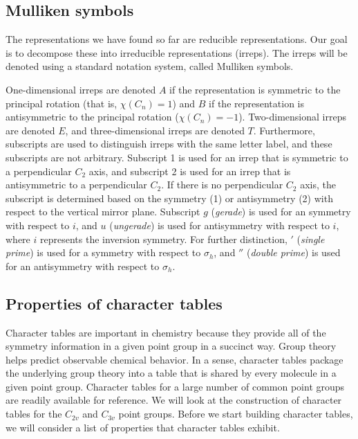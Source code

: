 \documentclass{article}
\begin{document}
    \subsection{Mulliken symbols}
    \label{sec:mulliken}

    The representations we have found so far are reducible representations. Our goal is to decompose these into irreducible representations (irreps). The irreps will be denoted using a standard notation system, called Mulliken symbols. \cite{mulliken1955}

    One-dimensional irreps are denoted $A$ if the representation is symmetric to the principal rotation (that is, $\chi(C_n)=1$) and $B$ if the representation is antisymmetric to the principal rotation ($\chi(C_n)=-1$). Two-dimensional irreps are denoted $E$, and three-dimensional irreps are denoted $T$. Furthermore, subscripts are used to distinguish irreps with the same letter label, and these subscripts are not arbitrary. Subscript 1 is used for an irrep that is symmetric to a perpendicular $C_2$ axis, and subscript 2 is used for an irrep that is antisymmetric to a perpendicular $C_2$. If there is no perpendicular $C_2$ axis, the subscript is determined based on the symmetry (1) or antisymmetry (2) with respect to the vertical mirror plane. Subscript $g$ (\emph{gerade}) is used for an symmetry with respect to $i$, and $u$ (\emph{ungerade}) is used for antisymmetry with respect to $i$, where $i$ represents the inversion symmetry. For further distinction, $'$ (\emph{single prime}) is used for a symmetry with respect to $\sigma_h$, and $''$ (\emph{double prime}) is used for an antisymmetry with respect to $\sigma_h$.
    
    \subsection{Properties of character tables}

    \label{sec:propchar}

    Character tables are important in chemistry because they provide all of the symmetry information in a given point group in a succinct way. Group theory helps predict observable chemical behavior. In a sense, character tables package the underlying group theory into a table that is shared by every molecule in a given point group. Character tables for a large number of common point groups are readily available for reference. We will look at the construction of character tables for the $C_{2v}$ and $C_{3v}$ point groups. Before we start building character tables, we will consider a list of properties that character tables exhibit. \cite{miessler2014,mcgrady2024,serre}
\end{document}
